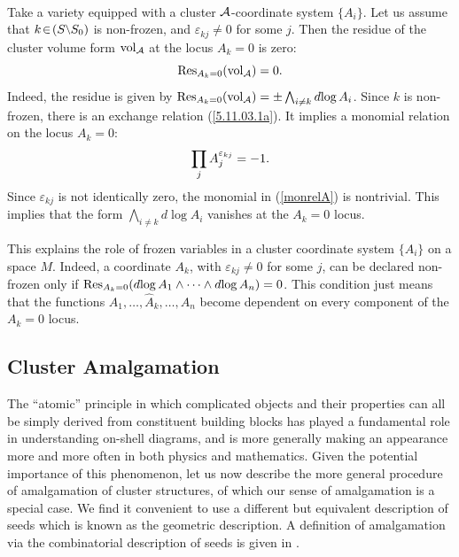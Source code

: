 \documentclass[12pt,hyperref,compress]{JHEP3}
\newcommand{\eq}[1]{\begin{equation}#1\end{equation}}
\begin{document}
\\Take a variety equipped with a cluster ${\cal A}$-coordinate system $\{A_i\}$. Let us assume that $k\!\in\!(S\raisebox{1pt}{\text{{\footnotesize$\backslash$}}} S_0)$ is non-frozen, and $\varepsilon_{kj}\not =0$ for some $j$. Then the residue of the cluster volume form ${\rm vol}_{\cal A}$ at the locus $A_k=0$ is zero:
\vspace{-.2cm}\eq{{\rm Res}_{A_k=0}({\rm vol}_{\cal A})=0.\vspace{-.2cm}}
Indeed, the residue  is given by ${\rm Res}_{A_k=0}({\rm vol}_{\cal A}) = \pm \bigwedge_{i\not = k}d\!\log A_i$. Since $k$ is non-frozen, there is an exchange relation (\ref{5.11.03.1a}). It implies a monomial relation on the locus $A_k=0$:
\vspace{-.2cm}\eq{\prod_{j} A_{j}^{\varepsilon_{kj}}= -1.\label{monrelA}\vspace{-.2cm}}
Since $\varepsilon_{kj}$ is not identically zero, the monomial in (\ref{monrelA}) is nontrivial. This implies that the form $\bigwedge_{i\not = k}d\!\log A_i$ vanishes at the $A_k=0$ locus.

This explains the role of frozen variables in  a cluster coordinate system $\{A_i\}$ on a space $M$. Indeed, a coordinate $A_k$, with $\varepsilon_{kj}\not =0$ for some $j$, can be declared non-frozen only if ${\rm Res}_{A_k=0}(d\!\log A_1 \wedge \cdots \wedge d\!\log A_n)=0$. This condition just means that the functions $A_1,\ldots, \widehat A_k, \ldots, A_n$ become dependent on every component of the $A_k=0$ locus.


\newpage 
\subsection{Cluster Amalgamation}
The ``atomic'' principle in which complicated objects and their properties can all be simply derived from constituent building blocks has played a fundamental role in understanding on-shell diagrams, and  is more generally making an appearance more and more often in both physics and mathematics. Given the potential importance of this phenomenon, let us now describe the more general procedure of amalgamation of cluster structures, of which our sense of amalgamation is a special case.  We find it convenient to use a different but equivalent description of seeds which is known as the geometric description. A definition of amalgamation via the combinatorial description of seeds is given in \cite{FG3}.
\end{document}
